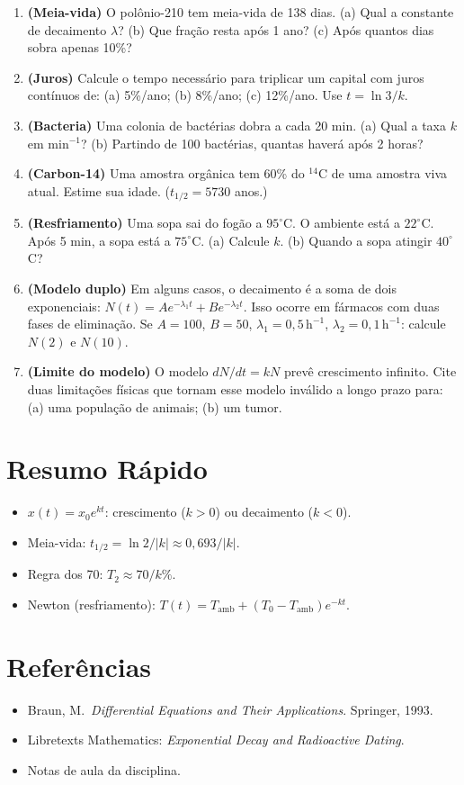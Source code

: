 \documentclass[12pt,a4paper]{article}
\begin{document}
\begin{enumerate}
  \item \textbf{(Meia-vida)} O pol\^onio-210 tem meia-vida de 138 dias. (a) Qual a constante de decaimento $\lambda$? (b) Que fra\c{c}\~ao resta ap\'os 1 ano? (c) Ap\'os quantos dias sobra apenas 10\%?
  
  \item \textbf{(Juros)} Calcule o tempo necess\'ario para triplicar um capital com juros cont\'inuos de: (a) 5\%/ano; (b) 8\%/ano; (c) 12\%/ano. Use $t = \ln 3/k$.
  
  \item \textbf{(Bacteria)} Uma colonia de bact\'erias dobra a cada 20 min. (a) Qual a taxa $k$ em min$^{-1}$? (b) Partindo de 100 bact\'erias, quantas haver\'a ap\'os 2 horas?
  
  \item \textbf{(Carbon-14)} Uma amostra org\^anica tem 60\% do ${}^{14}$C de uma amostra viva atual. Estime sua idade. ($t_{1/2} = 5730$ anos.)
  
  \item \textbf{(Resfriamento)} Uma sopa sai do fog\~ao a $95^\circ$C. O ambiente est\'a a $22^\circ$C. Ap\'os 5 min, a sopa est\'a a $75^\circ$C. (a) Calcule $k$. (b) Quando a sopa atingir $40^\circ$C?
  
  \item \textbf{(Modelo duplo)} Em alguns casos, o decaimento \'e a soma de dois exponenciais: $N(t)=A e^{-\lambda_1 t}+B e^{-\lambda_2 t}$. Isso ocorre em f\'armacos com duas fases de elimina\c{c}\~ao. Se $A=100$, $B=50$, $\lambda_1=0{,}5\,\text{h}^{-1}$, $\lambda_2=0{,}1\,\text{h}^{-1}$: calcule $N(2)$ e $N(10)$.
  
  \item \textbf{(Limite do modelo)} O modelo $dN/dt = kN$ prev\^e crescimento infinito. Cite duas limita\c{c}\~oes f\'isicas que tornam esse modelo inv\'alido a longo prazo para: (a) uma popula\c{c}\~ao de animais; (b) um tumor.
\end{enumerate}

\section*{Resumo R\'apido}
\begin{itemize}
  \item $x(t) = x_0 e^{kt}$: crescimento ($k>0$) ou decaimento ($k<0$).
  \item Meia-vida: $t_{1/2} = \ln 2/|k| \approx 0{,}693/|k|$.
  \item Regra dos 70: $T_2 \approx 70/k\%$.
  \item Newton (resfriamento): $T(t) = T_\text{amb} + (T_0-T_\text{amb})e^{-kt}$.
\end{itemize}

\section*{Refer\^encias}
\begin{itemize}
  \item Braun, M.\ \textit{Differential Equations and Their Applications}. Springer, 1993.
  \item Libretexts Mathematics: \textit{Exponential Decay and Radioactive Dating}.
  \item Notas de aula da disciplina.
\end{itemize}
\end{document}
